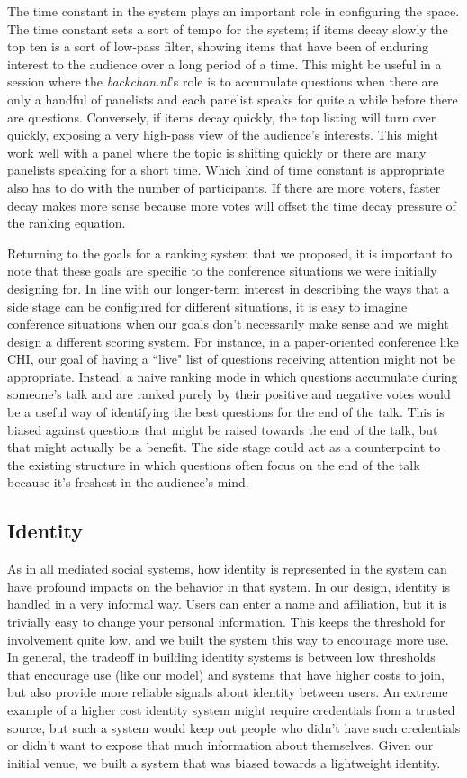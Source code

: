 The time constant in the system plays an important role in configuring the space. The time constant sets a sort of tempo for the system; if items decay slowly the top ten is a sort of low-pass filter, showing items that have been of enduring interest to the audience over a long period of a time. This might be useful in a session where the \emph{backchan.nl}'s role is to accumulate questions when there are only a handful of panelists and each panelist speaks for quite a while before there are questions. Conversely, if items decay quickly, the top listing will turn over quickly, exposing a very high-pass view of the audience's interests. This might work well with a panel where the topic is shifting quickly or there are many panelists speaking for a short time. Which kind of time constant is appropriate also has to do with the number of participants. If there are more voters, faster decay makes more sense because more votes will offset the time decay pressure of the ranking equation.

Returning to the goals for a ranking system that we proposed, it is important to note that these goals are specific to the conference situations we were initially designing for. In line with our longer-term interest in describing the ways that a side stage can be configured for different situations, it is easy to imagine conference situations when our goals don't necessarily make sense and we might design a different scoring system. For instance, in a paper-oriented conference like CHI, our goal of having a ``live" list of questions receiving attention might not be appropriate. Instead, a naive ranking mode in which questions accumulate during someone's talk and are ranked purely by their positive and negative votes would be a useful way of identifying the best questions for the end of the talk. This is biased against questions that might be raised towards the end of the talk, but that might actually be a benefit. The side stage could act as a counterpoint to the existing structure in which questions often focus on the end of the talk because it's freshest in the audience's mind.


\subsection{Identity}
As in all mediated social systems, how identity is represented in the system can have profound impacts on the behavior in that system. In our design, identity is handled in a very informal way. Users can enter a name and affiliation, but it is trivially easy to change your personal information. This keeps the threshold for involvement quite low, and we built the system this way to encourage more use. In general, the tradeoff in building identity systems is between low thresholds that encourage use (like our model) and systems that have higher costs to join, but also provide more reliable signals about identity between users. An extreme example of a higher cost identity system might require credentials from a trusted source, but such a system would keep out people who didn't have such credentials or didn't want to expose that much information about themselves. Given our initial venue, we built a system that was biased towards a lightweight identity.

